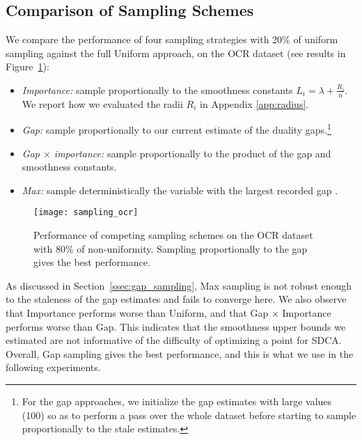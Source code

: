 \subsection{Comparison of Sampling Schemes} \label{experiment sampling}
We compare the performance of four sampling strategies with 20\% of uniform sampling against the full Uniform approach, on the OCR dataset (see results in Figure~\ref{fig:comparison sampling schemes}):\vspace{-2mm}
\begin{itemize}
	\item \textit{Importance:} sample proportionally to the smoothness constants $L_i = \lambda +\frac{R_i}{n}$. We report how we evaluated the radii $R_i$ in Appendix \ref{app:radius}. \vspace{-2mm}
	\item \textit{Gap:} sample proportionally to our current estimate of the duality gaps.\footnote{
		For the gap approaches, we initialize the gap estimates with large values (100) so as to perform a pass over the whole dataset before starting to sample proportionally to the stale estimates.
	} \vspace{-2mm}
	\item \textit{Gap $\times$ importance:} sample proportionally to the product of the gap and smoothness constants. \vspace{-2mm}
	\item \textit{Max:} sample deterministically the variable with the largest recorded gap \citep{dunner2017efficient}.
\end{itemize}
\begin{figure}[t]
	\centering \texttt{[image: sampling\_ocr]}
	\caption[
	Performance of competing sampling schemes on the OCR dataset
	]{
		Performance of competing sampling schemes on the OCR dataset with 80\% of non-uniformity. Sampling proportionally to the gap gives the best performance.
	}
	\label{fig:comparison sampling schemes}
\end{figure}

As discussed in Section~\ref{ssec:gap_sampling}, Max sampling is not robust enough to the staleness of the gap estimates and fails to converge here.
We also observe that Importance performs worse than Uniform, and that Gap $\times$ Importance performs worse than Gap.
This indicates that the smoothness upper bounds we estimated are not informative of the difficulty of optimizing a point for SDCA.
Overall, Gap sampling gives the best performance, and this is what we use in the following experiments.

